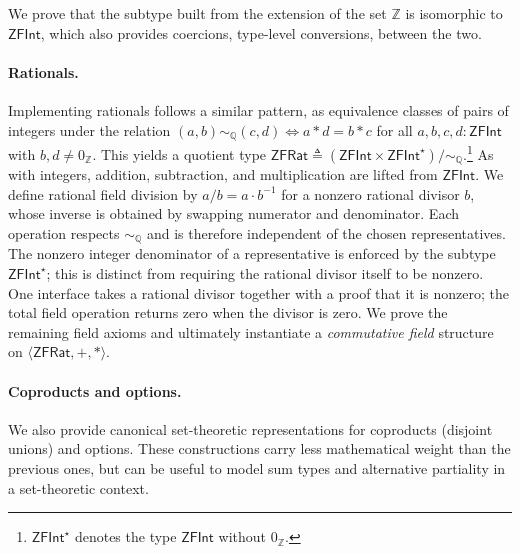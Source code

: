 We prove that the subtype built from the extension of the set $\mathbb{Z}$ is isomorphic to $\mathsf{ZFInt}$, which also provides coercions, \ie type-level conversions, between the two.

\newcommand{\qrel}{\ensuremath{\sim_{\mathbb{Q}}}}
\paragraph*{Rationals.}
Implementing rationals follows a similar pattern, as equivalence classes of pairs of integers under the relation $(a,b) \qrel (c,d) \iff a * d = b * c$ for all $a,b,c,d : \mathsf{ZFInt}$ with $b,d \neq 0_{\mathbb{Z}}$.
This yields a quotient type $\mathsf{ZFRat} \triangleq (\mathsf{ZFInt} \times \mathsf{ZFInt}^{\star})/\!\qrel$.\footnote{$\mathsf{ZFInt}^{\star}$ denotes the type $\mathsf{ZFInt}$ without $0_{\mathbb{Z}}$.}
As with integers, addition, subtraction, and multiplication are lifted from $\mathsf{ZFInt}$.
We define rational field division by $a/b = a \cdot b^{-1}$ for a nonzero rational divisor $b$, whose inverse is obtained by swapping numerator and denominator.
Each operation respects $\qrel$ and is therefore independent of the chosen representatives.
The nonzero integer denominator of a representative is enforced by the subtype $\mathsf{ZFInt}^{\star}$; this is distinct from requiring the rational divisor itself to be nonzero.
One interface takes a rational divisor together with a proof that it is nonzero; the total field operation returns zero when the divisor is zero.
We prove the remaining field axioms and ultimately instantiate a \emph{commutative field} structure on $\langle \mathsf{ZFRat}, +, * \rangle$.

\paragraph*{Coproducts and options.}
We also provide canonical set-theoretic representations for coproducts (disjoint unions) and options.
These constructions carry less mathematical weight than the previous ones, but can be useful to model sum types and alternative partiality in a set-theoretic context.

